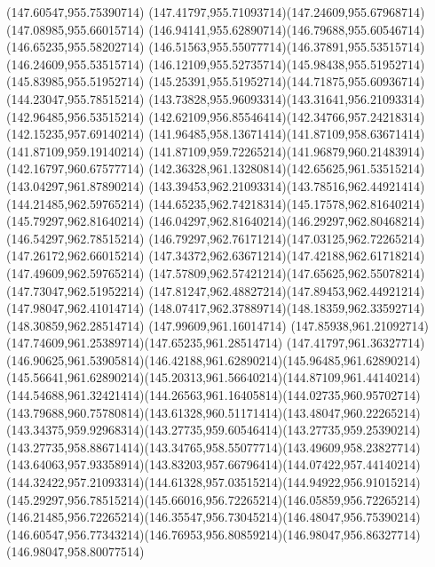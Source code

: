 {{	\closepath
	\moveto(147.60547,955.75390714)
	\curveto(147.41797,955.71093714)(147.24609,955.67968714)(147.08985,955.66015714)
	\curveto(146.94141,955.62890714)(146.79688,955.60546714)(146.65235,955.58202714)
	\curveto(146.51563,955.55077714)(146.37891,955.53515714)(146.24609,955.53515714)
	\curveto(146.12109,955.52735714)(145.98438,955.51952714)(145.83985,955.51952714)
	\curveto(145.25391,955.51952714)(144.71875,955.60936714)(144.23047,955.78515214)
	\curveto(143.73828,955.96093314)(143.31641,956.21093314)(142.96485,956.53515214)
	\curveto(142.62109,956.85546414)(142.34766,957.24218314)(142.15235,957.69140214)
	\curveto(141.96485,958.13671414)(141.87109,958.63671414)(141.87109,959.19140214)
	\curveto(141.87109,959.72265214)(141.96879,960.21483914)(142.16797,960.67577714)
	\curveto(142.36328,961.13280814)(142.65625,961.53515214)(143.04297,961.87890214)
	\curveto(143.39453,962.21093314)(143.78516,962.44921414)(144.21485,962.59765214)
	\curveto(144.65235,962.74218314)(145.17578,962.81640214)(145.79297,962.81640214)
	\curveto(146.04297,962.81640214)(146.29297,962.80468214)(146.54297,962.78515214)
	\curveto(146.79297,962.76171214)(147.03125,962.72265214)(147.26172,962.66015214)
	\curveto(147.34372,962.63671214)(147.42188,962.61718214)(147.49609,962.59765214)
	\curveto(147.57809,962.57421214)(147.65625,962.55078214)(147.73047,962.51952214)
	\curveto(147.81247,962.48827214)(147.89453,962.44921214)(147.98047,962.41014714)
	\curveto(148.07417,962.37889714)(148.18359,962.33592714)(148.30859,962.28514714)
	\lineto(147.99609,961.16014714)
	\curveto(147.85938,961.21092714)(147.74609,961.25389714)(147.65235,961.28514714)
	\lineto(147.41797,961.36327714)
	\curveto(146.90625,961.53905814)(146.42188,961.62890214)(145.96485,961.62890214)
	\curveto(145.56641,961.62890214)(145.20313,961.56640214)(144.87109,961.44140214)
	\curveto(144.54688,961.32421414)(144.26563,961.16405814)(144.02735,960.95702714)
	\curveto(143.79688,960.75780814)(143.61328,960.51171414)(143.48047,960.22265214)
	\curveto(143.34375,959.92968314)(143.27735,959.60546414)(143.27735,959.25390214)
	\curveto(143.27735,958.88671414)(143.34765,958.55077714)(143.49609,958.23827714)
	\curveto(143.64063,957.93358914)(143.83203,957.66796414)(144.07422,957.44140214)
	\curveto(144.32422,957.21093314)(144.61328,957.03515214)(144.94922,956.91015214)
	\curveto(145.29297,956.78515214)(145.66016,956.72265214)(146.05859,956.72265214)
	\curveto(146.21485,956.72265214)(146.35547,956.73045214)(146.48047,956.75390214)
	\curveto(146.60547,956.77343214)(146.76953,956.80859214)(146.98047,956.86327714)
	\lineto(146.98047,958.80077514)
}}
